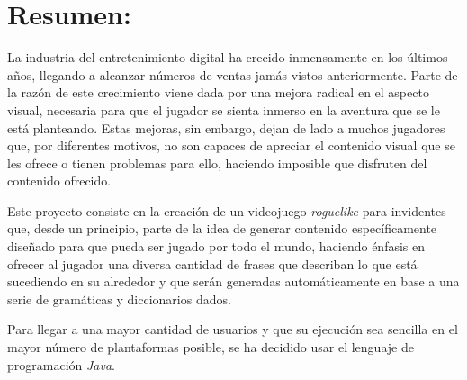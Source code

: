 \section*{Resumen:}

La industria del entretenimiento digital ha crecido inmensamente en los últimos años, llegando a alcanzar números de ventas jamás vistos anteriormente.
Parte de la razón de este crecimiento viene dada por una mejora radical en el aspecto visual, necesaria para que el jugador se sienta inmerso en la aventura que se le está planteando.
Estas mejoras, sin embargo, dejan de lado a muchos jugadores que, por diferentes motivos, no son capaces de apreciar el contenido visual que se les ofrece o tienen problemas para ello, haciendo imposible que disfruten del contenido ofrecido.

Este proyecto consiste en la creación de un videojuego \textit{roguelike} para invidentes que, desde un principio, parte de la idea de generar contenido específicamente diseñado para que pueda ser jugado por todo el mundo, haciendo énfasis en ofrecer al jugador una diversa cantidad de frases que describan lo que está sucediendo en su alrededor y que serán generadas automáticamente en base a una serie de gramáticas y diccionarios dados.

Para llegar a una mayor cantidad de usuarios y que su ejecución sea sencilla en el mayor número de plantaformas posible, se ha decidido usar el lenguaje de programación \textit{Java}.

